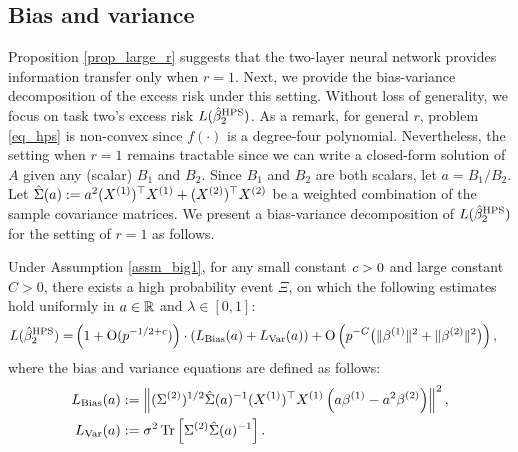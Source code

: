 \subsection{Bias and variance}

Proposition \ref{prop_large_r} suggests that the two-layer neural network provides information transfer only when $r = 1$.
Next, we provide the bias-variance decomposition of the excess risk under this setting.
Without loss of generality, we focus on task two's excess risk $L(\hat{\beta}^{\textup{HPS}}_2)$.
As a remark, for general $r$, problem \eqref{eq_hps} is non-convex since $f(\cdot)$ is a degree-four polynomial.
Nevertheless, the setting when $r = 1$ remains tractable since we can write a closed-form solution of $A$ given any (scalar) $B_1$ and $B_2$.
Since $B_1$ and $B_2$ are both scalars, let $a = B_1 / B_2$.
Let $\hat{\Sigma}(a) := a^2 (X^{(1)})^{\top} X^{(1)} + (X^{(2)})^{\top} X^{(2)}$ be a weighted combination of the sample covariance matrices.
We present a bias-variance decomposition of $L(\hat{\beta}^{\textup{HPS}}_2)$ for the setting of $r = 1$ as follows.

\begin{proposition}\label{lem_HPS_loss}
     Under Assumption \ref{assm_big1}, for any small constant ${\mathit{c}}>0$ and large constant $C>0$, there exists a high probability event $\Xi$, on which the following estimates hold uniformly in $a\in \mathbb{R}$ and $\lambda\in [0,1]$:
    \begin{align}
        L(\hat{\beta}_2^{\MTL}) =& \left( 1+ \OO(p^{-1/2+c})\right)\cdot \left(L_{\bias} (a) + L_{\var}(a)\right) %
        + \OO \left( p^{-C}\big( \|\beta^{(1)} \|^2  +  \|\beta^{(2)} \|^2\big)   \right), \label{L_HPS_simple}
    \end{align}
    where the bias and variance equations are defined as follows:
    \begin{align}
        L_{\textup{Bias}} (a) &:= \left\| (\Sigma^{(2)})^{1/2}\hat \Sigma(a)^{-1} (X^{(1)})^\top X^{(1)} \left(a\beta^{(1)}- a^2\beta^{(2)}\right) \right\|^2,  \label{Lbias} \\
        L_{\operatorname{Var}}(a)   &:= \sigma^2  \operatorname{Tr}\left[{\Sigma^{(2)}\hat \Sigma(a)^{-1}  }\right].  \label{Lvar}
    \end{align}
\end{proposition}

